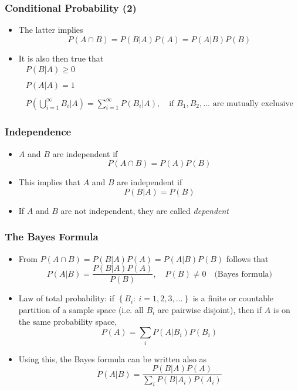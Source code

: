 \documentclass[10pt]{beamer}
\theoremstyle{definition}
\begin{document}
\begin{frame}[fragile]
\frametitle{Conditional Probability (2)}
\begin{itemize}
	\item The latter implies
	\[
		P(A\cap B)  = P(B|A)P(A) = P(A|B)P(B)
	\]
	
	\item It is also then true that
	\[
		\begin{array}{lcl}
			P(B|A) \geq 0\\
			\quad\\
			P(A|A) = 1\\
			\quad\\
			\displaystyle P(\bigcup_{i=1}^{\infty} B_{i}|A ) = \sum_{i = 1}^{\infty} P(B_{i}|A),\quad \textrm{if } B_{1}, B_{2},\ldots \textrm{ are mutually exclusive}
		\end{array}
	\]
\end{itemize}
\end{frame}

\begin{frame}[fragile]
\frametitle{Independence}
\begin{itemize}
	\item $ A $ and $ B $ are independent if
	\[
		P(A\cap B) = P(A)P(B)
	\]
		
	\item This implies that $ A $ and $ B $ are independent if
	\[
		P(B|A) = P(B)
	\]
		
	\item If $ A $ and $ B $ are not independent, they are called \textit{dependent}
\end{itemize}
\end{frame}

\begin{frame}[fragile]
	\frametitle{The Bayes Formula}
	\begin{itemize}
		\item From $ P(A\cap B)  = P(B|A)P(A) = P(A|B)P(B) $ follows that
		\[
			P(A|B) = \dfrac{P(B|A)P(A)}{P(B)}, \quad P(B) \neq 0 \quad \textrm{(Bayes formula)}
		\]
		
		\item Law of total probability:  if $ \displaystyle \left\{B_{i}:\ i=1,2,3,\ldots \right\}$ is a finite or countable partition of a sample space (i.e. all $ B_{i} $ are pairwise disjoint), then if $ A $ is on the same probability space,
		\[
			P(A) = \sum_{i} P(A|B_{i})P(B_{i})
		\]
		
		\item Using this, the Bayes formula can be written also as
		\[
			P(A|B) = \dfrac{P(B|A)P(A)}{\displaystyle\sum_{i} P(B|A_{i})P(A_{i})}
		\]
	\end{itemize}
\end{frame}
\end{document}
